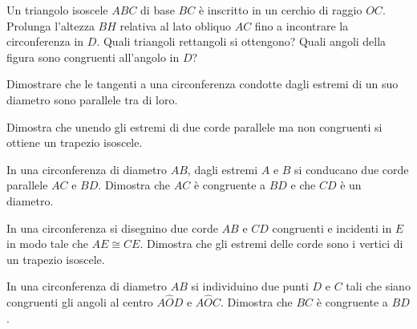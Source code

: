 \begin{multicols}{2}
\begin{esercizio}
\label{ese:5.23}
Un triangolo isoscele \(ABC\) di base \(BC\) è inscritto in un cerchio di 
raggio \(OC\). Prolunga l'altezza \(BH\) relativa al lato obliquo \(AC\) 
fino a incontrare la circonferenza in \(D\). Quali triangoli rettangoli 
si ottengono? Quali angoli della figura sono congruenti all'angolo in 
\(D\)?
\end{esercizio}

\begin{esercizio}
\label{ese:5.24}
Dimostrare che le tangenti a una circonferenza condotte dagli estremi 
di un suo diametro sono parallele tra di loro.
\end{esercizio}


\begin{esercizio}
\label{ese:5.30}
Dimostra che unendo gli estremi di due corde parallele ma non 
congruenti si ottiene un trapezio isoscele.
\end{esercizio}



\begin{esercizio}
\label{ese:5.34}
In una circonferenza di diametro \(AB\), dagli estremi \(A\) e \(B\) si 
conducano due corde parallele \(AC\) e \(BD\). Dimostra che \(AC\) è 
congruente a \(BD\) e che \(CD\) è un diametro.
\end{esercizio}

\begin{esercizio}
\label{ese:5.35}
In una circonferenza si disegnino due corde \(AB\) e \(CD\) congruenti e 
incidenti in \(E\) in modo tale che \(AE\cong CE\). Dimostra che gli 
estremi delle corde sono i vertici di un trapezio isoscele.
\end{esercizio}

\begin{esercizio}
\label{ese:5.36}
In una circonferenza di diametro \(AB\) si individuino due punti \(D\) e 
\(C\) tali che siano congruenti gli angoli al centro \(A\widehat{O}D\) e 
\(A\widehat{O}C\). Dimostra che \(BC\) è congruente a \(BD\).
\end{esercizio}


\end{multicols}
